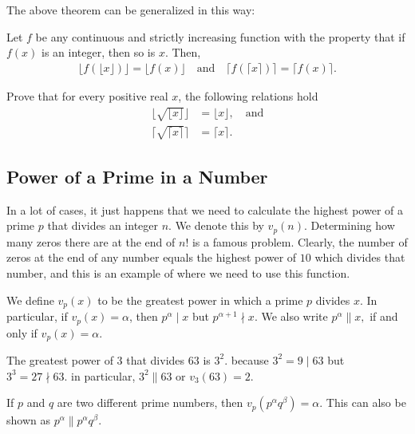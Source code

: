 \documentclass[12pt]{subfile}
\begin{document}
The above theorem can be generalized in this way: 
\begin{theorem}
	Let $f$ be any continuous and strictly increasing function with the property that if $f(x)$ is an integer, then so is $x$. Then,
	\begin{align*}
	\bigg\lfloor f(\lfloor x \rfloor)\bigg\rfloor  = \bigg\lfloor f(x) \bigg\rfloor \quad \text{and} \quad \bigg\lceil f(\lceil x \rceil)\bigg\rceil  = \bigg\lceil f(x) \bigg\rceil.
	\end{align*}
\end{theorem}

\begin{problem}
	Prove that for every positive real $x$, the following relations hold
		\begin{align*}
		\big\lfloor \sqrt {\lfloor x \rfloor} \big\rfloor &= \lfloor x \rfloor, \quad \text{and}\\
		\big\lceil \sqrt{ \lceil x \rceil} \big\rceil &= \lceil x \rceil.
		\end{align*}
\end{problem}




\subsection{Power of a Prime in a Number} \label{sec:powerofprimes}
In a lot of cases, it just happens that we need to calculate the highest power of a prime $p$ that divides an integer $n$. We denote this by $v_p(n)$. Determining how many zeros there are at the end of $n!$ is a famous problem. Clearly, the number of zeros at the end of any number equals the highest power of $10$ which divides that number, and this is an example of where we need to use this function.

\begin{definition}\label{def:vp}
	We define $v_p(x)$ to be the greatest power in which a prime $p$ divides $x$. In particular, if $v_p(x)=\alpha$, then $p^{\alpha} \mid x$ but $p^{\alpha+1} \nmid x$. We also write $p^{\alpha} \|  x, $ if and only if $v_p(x) = \alpha$.
\end{definition}

\begin{example} 
	The greatest power of $3$ that divides $63$ is $3^2.$ because $3^2=9 \mid 63$ but $3^3 =27 \nmid 63.$
	in particular, $ 3^2 \|  63$ or $v_3(63)=2.$
\end{example}

\begin{example}
	If $p$ and $q$ are two different prime numbers, then $ v_p( p^ \alpha q^ \beta) = \alpha$. This can also be shown as $p^\alpha \|  p^ \alpha q^ \beta$.
\end{example}
\end{document}
